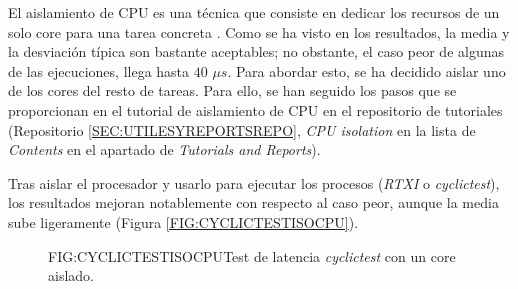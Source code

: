 
El aislamiento de CPU es una técnica que consiste en dedicar los recursos de un solo core para una tarea concreta \cite{Amaducci2022}. Como se ha visto en los resultados, la media y la desviación típica son bastante aceptables; no obstante, el caso peor de algunas de las ejecuciones, llega hasta $40$ $\mu s$. Para abordar esto, se ha decidido aislar uno de los cores del resto de tareas. Para ello, se han seguido los pasos que se proporcionan en el tutorial de aislamiento de CPU en el repositorio de tutoriales (Repositorio \ref{SEC:UTILESYREPORTSREPO}, \textit{CPU isolation} en la lista de \textit{Contents} en el apartado de \textit{Tutorials and Reports}).

Tras aislar el procesador y usarlo para ejecutar los procesos (\textit{RTXI} o \textit{cyclictest}), los resultados mejoran notablemente con respecto al caso peor, aunque la media sube ligeramente (Figura \ref{FIG:CYCLICTESTISOCPU}).

\begin{figure}[Ejecución de cylictest con un core aislado]{FIG:CYCLICTESTISOCPU}{Test de latencia \textit{cyclictest} con un core aislado.}
\end{figure}
